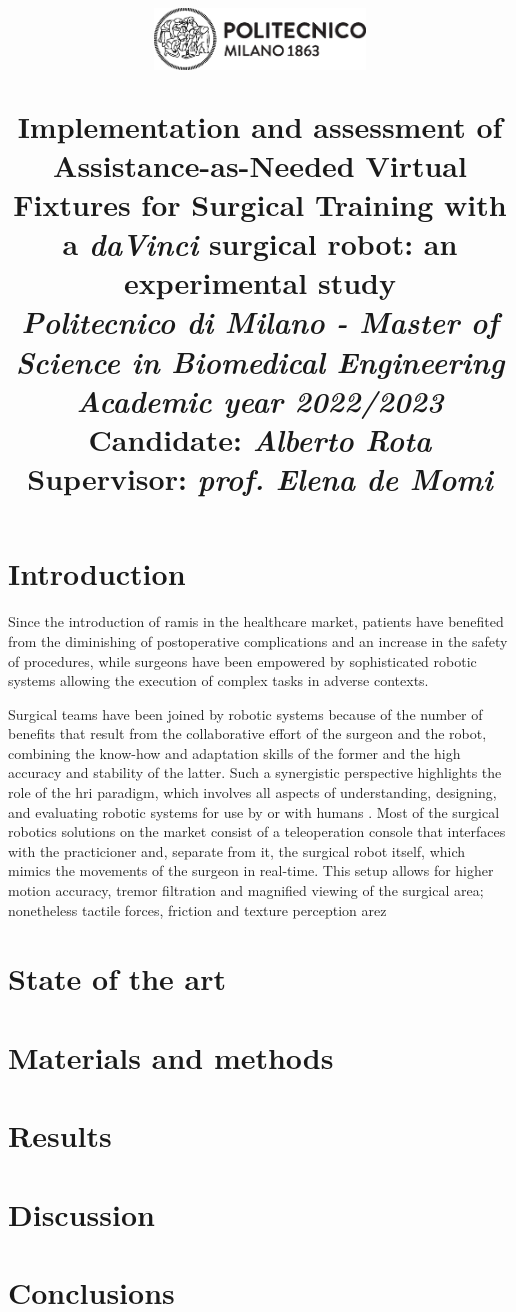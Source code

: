 \documentclass{article}
\title{
\begin{figure}[h!]
\centering
\includegraphics[width=0.5\textwidth]{images/logo_polimi_scritta2.eps}
\end{figure}
\textbf{Implementation and assessment of Assistance-as-Needed Virtual Fixtures for Surgical Training with a \textit{daVinci} surgical robot: an experimental study}
\\
\vspace{0.5cm}\large{\textit{Politecnico di Milano - Master of Science in Biomedical Engineering}}
\\
\vspace{0.5cm}\textit{\small{Academic year 2022/2023}}\vspace{0.5cm}\\
{\large \textbf{Candidate: \textit{Alberto Rota}}\\
\textbf{Supervisor: \textit{prof. Elena de Momi}}}}
\author{}
\date{}
\begin{document}
\maketitle

\begin{multicols}{2}

\section{Introduction}
Since the introduction of \ac{ramis} in the healthcare market, patients have benefited from the diminishing of postoperative complications and an increase in the safety of procedures, while surgeons have been empowered by sophisticated robotic systems allowing the execution of complex tasks in adverse contexts. 

Surgical teams have been joined by robotic systems because of the number of benefits that result from the collaborative effort of the surgeon and the robot, combining the know-how and adaptation skills of the former and the high accuracy and stability of the latter. Such a synergistic perspective highlights the role of the \ac{hri} paradigm, which involves all aspects of understanding, designing, and evaluating robotic systems for use by or with humans \cite{Goodrich2007}. Most of the surgical robotics solutions on the market consist of a teleoperation console that interfaces with the practicioner and, separate from it, the surgical robot itself, which mimics the movements of the surgeon in real-time. This setup allows for higher motion accuracy, tremor filtration and magnified viewing of the surgical area; nonetheless tactile forces, friction and texture perception arez
\section{State of the art}
\section{Materials and methods}
\section{Results}
\section{Discussion}
\section{Conclusions}


\end{multicols}
\end{document}

